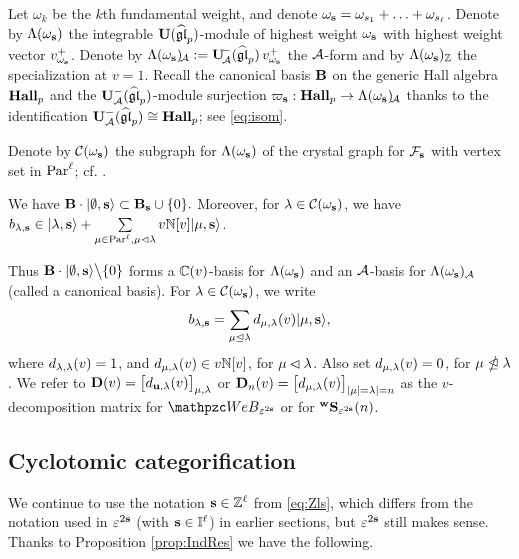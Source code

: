 Let $\omega_k$ be the $k$th fundamental weight, and denote $\omega_{\mathbf{s}} =\omega_{s_1} +\ldots +\omega_{s_\ell}$.
Denote by $\Lambda (\omega_{\mathbf{s}})$ the integrable $\bold{U}(\widehat{\mathfrak {gl}}_p)$-module of highest weight $\omega_{\mathbf{s}}$ with highest weight vector $v^+_{\omega_{\mathbf{s}}}$. Denote by $\Lambda (\omega_{\mathbf{s}})\!_{\mathcal{A}} :=\bold{U}\!_{\mathcal{A}}^-(\widehat{\mathfrak {gl}}_p)\,  v^+_{\omega_{\mathbf{s}}}$ the $\mathcal{A}$-form and by $\Lambda (\omega_{\mathbf{s}})_{\mathbb{Z}}$ the specialization at $v=1$. 
Recall the canonical basis $\mathbf{B}$ on the generic Hall algebra $\bold{Hall}_{p}$ and the $\bold{U}^-_{\mathcal{A}}(\widehat{\mathfrak {gl}}_p)$-module surjection $\varpi_{\mathbf{s}}: \bold{Hall}_{p} \rightarrow \Lambda(\omega_{\mathbf{s}})\!_{\mathcal{A}}$ thanks to the identification $\bold{U}^-_{\mathcal{A}}(\widehat{\mathfrak{gl}}_p) \cong \bold{Hall}_{p}$; see \eqref{eq:isom}.

Denote by $\mathcal C (\omega_{\mathbf{s}})$ the subgraph for $\Lambda (\omega_{\mathbf{s}})$ of the crystal graph for $\mathcal{F}_{\mathbf{s}}$ with vertex set in $\text{Par}^\ell$; cf. \cite{Kas91, Sch00}. 

\begin{theorem} \cite[Theorem 4.2]{Sch00}
\label{thm:Sch00}
    We have $\mathbf{B} \cdot |\emptyset, \mathbf{s} \rangle \subset \mathbf{B}_{\mathbf{s}} \cup \{0\}.$ Moreover, for $\lambda\in \mathcal C (\omega_{\mathbf{s}})$, we have $b_{\lambda,\mathbf{s}} \in |\lambda, \mathbf{s} \rangle + \sum\limits_{\mu \in \text{Par}^\ell, \mu\lhd\lambda} v\mathbb{N}[v] |\mu, \mathbf{s} \rangle$.
\end{theorem}
Thus $\mathbf{B} \cdot |\emptyset, \mathbf{s} \rangle \big\backslash \{0\}$ forms a $\mathbb{C}(v)$-basis for $\Lambda (\omega_{\mathbf{s}})$ and an $\mathcal{A}$-basis for $\Lambda (\omega_{\mathbf{s}})_{\mathcal{A}}$ (called a canonical basis). For $\lambda\in \mathcal C (\omega_{\mathbf{s}})$, we write
\begin{align} \label{eq:decomposition}
    b_{\lambda,\mathbf{s}} = \sum_{\mu \unlhd \lambda} d_{\mu,\lambda}(v) |\mu, \mathbf{s} \rangle,
\end{align}
where $d_{\lambda,\lambda}(v)=1$, and $d_{\mu,\lambda}(v) \in v\mathbb{N}[v]$, for $\mu\lhd\lambda$. Also set $d_{\mu,\lambda}(v)=0$, for $\mu\ntrianglelefteq\lambda$. We refer to $\bold{D}(v) =\big[d_{\mathbf{u},\lambda}(v)\big]_{\mu,\lambda}$ or $\bold{D}_n(v) =\big[d_{\mu,\lambda}(v)\big]_{|\mu|=\lambda|=n}$ as the $v$-decomposition matrix for $\qW_{\eps^{2\bfs}}$ or for ${}^{\bold{w}}\bold{S}_{\varepsilon^{2\mathbf{s}}}(n)$. 




\subsection{Cyclotomic categorification}

We continue to use the notation $\mathbf{s} \in \mathbb{Z}^\ell$ from \eqref{eq:Zls}, which differs from the notation used in $\varepsilon^{2\mathbf{s}}$ (with $\mathbf{s} \in \mathbb{I}^\ell$) in earlier sections, but $\varepsilon^{2\mathbf{s}}$ still makes sense. 
Thanks to Proposition \ref{prop:IndRes} we have the following. 
  

